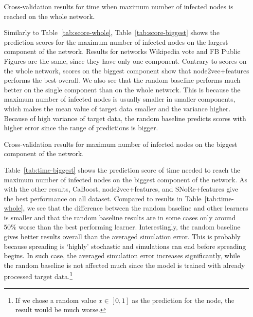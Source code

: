 \documentclass{article}
\begin{document}
\begin{table*}[b!]
    \centering
    	\caption{Cross-validation results for time when maximum number of infected nodes is reached on the whole network.}
    \resizebox{\columnwidth}{!}{
	}
	\label{tab:time-whole}
\end{table*}

Similarly to Table~\ref{tab:score-whole}, Table~\ref{tab:score-biggest} shows the prediction scores for the maximum number of infected nodes on the largest component of the network. Results for networks Wikipedia vote and FB Public Figures are the same, since they have only one component. Contrary to scores on the whole network, scores on the biggest component show that node2vec+features performs the best overall. We also see that the random baseline performs much better on the single component than on the whole network. This is because the maximum number of infected nodes is usually smaller in smaller components, which makes the mean value of target data smaller and the variance higher. Because of high variance of target data, the random baseline predicts scores with higher error since the range of predictions is bigger.

\begin{table*}[t!]
    \centering
	\caption{Cross-validation results for maximum number of infected nodes on the biggest component of the network.}    \resizebox{\columnwidth}{!}{
	}
	\label{tab:score-biggest}
\end{table*}

Table~\ref{tab:time-biggest} shows the prediction score of time needed to reach the maximum number of infected nodes on the biggest component of the network. As with the other results, CaBoost, node2vec+features, and SNoRe+features give the best performance on all dataset. Compared to results in Table~\ref{tab:time-whole}, we see that the difference between the random baseline and other learners is smaller and that the random baseline results are in some cases only around 50\% worse than the best performing learner. Interestingly, the random baseline gives better results overall than the averaged simulation error. This is probably because spreading is `highly' stochastic and simulations can end before spreading begins. In such case, the averaged simulation error increases significantly, while the random baseline is not affected much since the model is trained with already processed target data.\footnote{If we chose a random value $x\in[0, 1]$ as the prediction for the node, the result would be much worse.}
\end{document}
